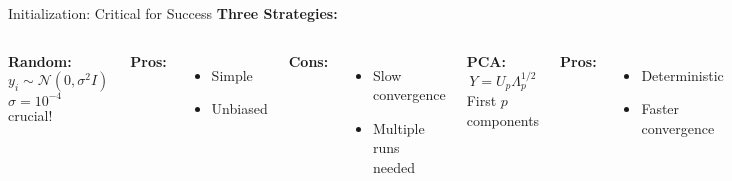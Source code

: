 \begin{frame}{Initialization: Critical for Success}
\textbf{Three Strategies:}

\begin{columns}
\textbf{Random:}
$$y_i \sim \mathcal{N}(0, \sigma^2 I)$$
$\sigma = 10^{-4}$ crucial!

\textbf{Pros:}
\begin{itemize}
\item Simple
\item Unbiased
\end{itemize}

\textbf{Cons:}
\begin{itemize}
\item Slow convergence
\item Multiple runs needed
\end{itemize}

\textbf{PCA:}
$$Y = U_p \Lambda_p^{1/2}$$
First $p$ components

\textbf{Pros:}
\begin{itemize}
\item Deterministic
\item Faster convergence
\end{itemize}

\textbf{Cons:}
\begin{itemize}
\item Linear bias
\item May miss structure
\end{itemize}

\textbf{Laplacian Eigenmaps:}
$$Y = \text{eigvecs}(L)$$
Graph Laplacian

\textbf{Pros:}
\begin{itemize}
\item Manifold-aware
\item Good for graphs
\end{itemize}

\textbf{Cons:}
\begin{itemize}
\item Expensive
\item Parameter sensitive
\end{itemize}
\end{columns}

\vspace{0.3cm}
\end{frame}

